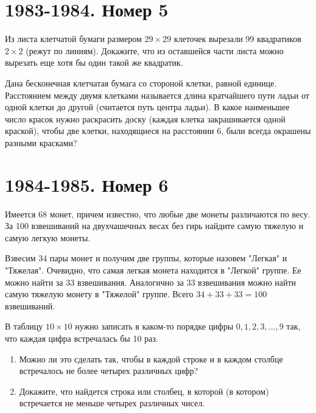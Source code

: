 \documentclass[11pt, a4paper]{common/document_template}
\begin{document}
\chapter{1983-1984. Номер 5}

\begin{exercise}
Из листа клетчатой бумаги размером $29 \times 29$ клеточек вырезали 99 квадратиков $2 \times 2$ (режут по линиям). Докажите, что из оставшейся части листа можно вырезать еще хотя бы один такой же квадратик.
\end{exercise}

\begin{exercise}
Дана бесконечная клетчатая бумага со стороной клетки, равной единице. Расстоянием между двумя клетками называется длина кратчайшего пути ладьи от одной клетки до другой (считается путь центра ладьи). В какое наименьшее число красок нужно раскрасить доску (каждая клетка закрашивается одной краской), чтобы две клетки, находящиеся на расстоянии 6, были всегда окрашены разными красками?
\end{exercise}


\chapter{1984-1985. Номер 6}

\begin{exercise}
Имеется 68 монет, причем известно, что любые две монеты различаются по весу. За 100 взвешиваний на \newline двухчашечных весах без гирь найдите самую тяжелую и самую легкую монеты.
\end{exercise}

\begin{Solution}
Взвесим 34 пары монет и получим две группы, которые назовем "Легкая" и "Тяжелая". Очевидно, что самая легкая монета находится в "Легкой" группе. Ее можно найти за 33 взвешивания. Аналогично за 33 взвешивания можно найти самую тяжелую монету в "Тяжелой" группе. Всего $34 + 33 + 33 = 100$ взвешиваний.
\end{Solution}

\begin{exercise}
В таблицу $10 \times 10$ нужно записать в каком-то порядке цифры $0, 1, 2, 3, \dots, 9$ так, что каждая цифра встречалась бы 10 раз.
\begin{enumerate}
\item Можно ли это сделать так, чтобы в каждой строке и в каждом столбце встречалось не более четырех различных цифр?
\item Докажите, что найдется строка или столбец, в которой (в котором) встречается не меньше четырех различных чисел.
\end{enumerate}
\end{exercise}
\end{document}
